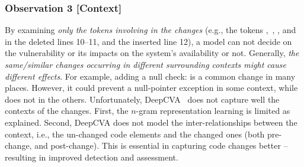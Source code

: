 \subsubsection{{\bf Observation 3} [Context]}

By examining {\em only the tokens involving in the changes} (e.g., the
tokens ,~, , and
 in the deleted lines 10--11, and the inserted line 12),
a model can not decide on the vulnerability or its impacts on the
system's availability or not. Generally, {\em the same/similar changes
  occurring in different surrounding contexts might cause different
  effects}.
For example, adding a null check:  is a common
change in many places. However, it could prevent a null-pointer
exception in some context, while does not in the others.
Unfortunately, DeepCVA~\cite{deepCVA-ase21} does not capture well the
contexts of the changes. First, the $n$-gram representation learning
is limited as explained.
%
Second, DeepCVA does not model the inter-relationships between the
context, i.e., the un-changed code elements and the changed ones (both
pre-change, and post-change).  This is essential in capturing code
changes better -- resulting in improved detection and assessment.

